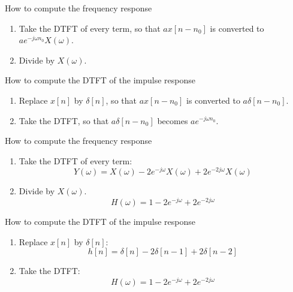 \documentclass{beamer}
\begin{document}
\begin{frame}
  \begin{block}{How to compute the frequency response}
    \begin{enumerate}
    \item Take the DTFT of every term, so that $ax[n-n_0]$ is
      converted to $ae^{-j\omega n_0}X(\omega)$.
    \item Divide by $X(\omega)$.
    \end{enumerate}
  \end{block}

  \begin{block}{How to compute the DTFT of the impulse response}
    \begin{enumerate}
    \item Replace $x[n]$ by $\delta[n]$, so that $ax[n-n_0]$ is
      converted to $a\delta[n-n_0]$.
    \item Take the DTFT, so that $a\delta[n-n_0]$ becomes
      $ae^{-j\omega n_0}$.
    \end{enumerate}
  \end{block}
\end{frame}
  
\begin{frame}
  \begin{block}{How to compute the frequency response}
    \begin{enumerate}
    \item Take the DTFT of every term:
      \[
      Y(\omega)= X(\omega) -2e^{-j\omega}X(\omega)+2e^{-2j\omega}X(\omega)
      \]
    \item Divide by $X(\omega)$.
      \[
      H(\omega)= 1-2e^{-j\omega} +2e^{-2j\omega}
      \]
    \end{enumerate}
  \end{block}

  \begin{block}{How to compute the DTFT of the impulse response}
    \begin{enumerate}
    \item Replace $x[n]$ by $\delta[n]$:
      \[
      h[n]= \delta[n] -2\delta[n-1] +2\delta[n-2]
      \]      
    \item Take the DTFT:
      \[
      H(\omega)= 1-2e^{-j\omega} + 2e^{-2j\omega}
      \]      
    \end{enumerate}
  \end{block}
\end{frame}

\end{document}
